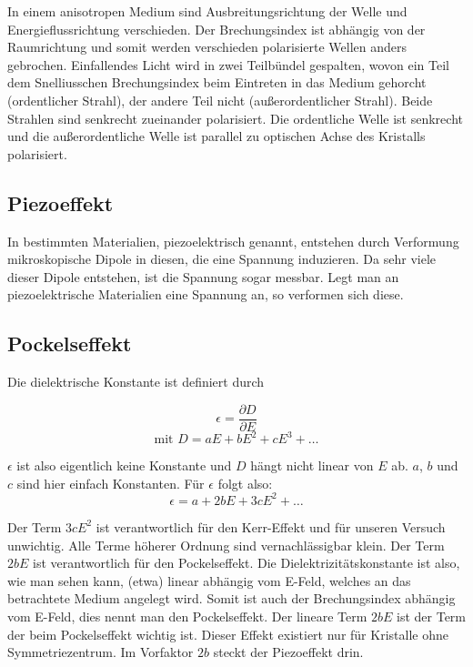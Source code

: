 In einem anisotropen Medium sind Ausbreitungsrichtung der Welle und Energieflussrichtung verschieden. Der Brechungsindex ist abhängig von der Raumrichtung und somit werden verschieden polarisierte Wellen anders gebrochen. Einfallendes Licht wird in zwei Teilbündel gespalten, wovon ein Teil dem Snelliusschen Brechungsindex beim Eintreten in das Medium gehorcht (ordentlicher Strahl), der andere Teil nicht (außerordentlicher Strahl). Beide Strahlen sind senkrecht zueinander polarisiert. Die ordentliche Welle ist senkrecht und die außerordentliche Welle ist parallel zu optischen Achse des Kristalls polarisiert.


\subsection{Piezoeffekt}

In bestimmten Materialien, piezoelektrisch genannt, entstehen durch Verformung mikroskopische Dipole in diesen, die eine Spannung induzieren. Da sehr viele dieser Dipole entstehen, ist die Spannung sogar messbar. Legt man an piezoelektrische Materialien eine Spannung an, so verformen sich diese.


\subsection{Pockelseffekt}

Die dielektrische Konstante ist definiert durch 

\begin{equation} \epsilon = \frac{\partial D}{\partial E}  \end{equation}
\begin{equation} \text{mit \ } D = aE + bE^2 + cE^3 + \dots \end{equation}

$\epsilon$ ist also eigentlich keine Konstante und $D$ hängt nicht linear von $E$ ab. $a$, $b$ und $c$ sind hier einfach Konstanten. Für $\epsilon$ folgt also:
\begin{equation} \epsilon = a + 2bE + 3cE^2 + \dots \end{equation}

Der Term $3cE^2$ ist verantwortlich für den Kerr-Effekt und für unseren Versuch unwichtig. Alle Terme höherer Ordnung sind vernachlässigbar klein. Der Term $2bE$ ist verantwortlich für den Pockelseffekt. Die Dielektrizitätskonstante ist also, wie man sehen kann, (etwa) linear abhängig vom E-Feld, welches an das betrachtete Medium angelegt wird. Somit ist auch der Brechungsindex abhängig vom E-Feld, dies nennt man den Pockelseffekt. Der lineare Term $2bE$ ist der Term der beim Pockelseffekt wichtig ist. Dieser Effekt existiert nur für Kristalle ohne Symmetriezentrum. Im Vorfaktor $2b$ steckt der Piezoeffekt drin. 


